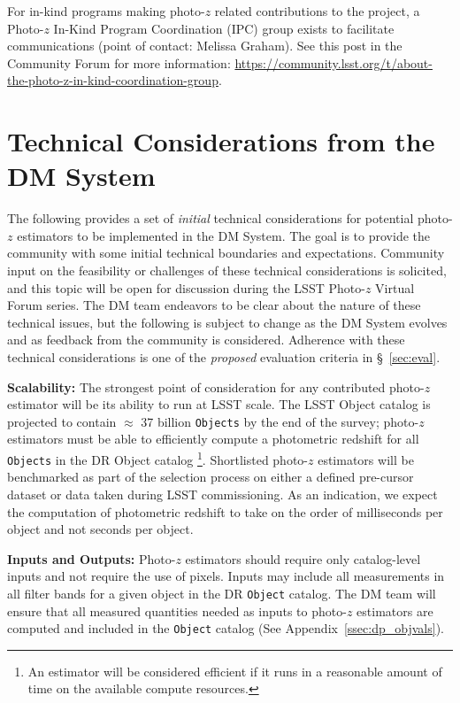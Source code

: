 \documentclass[DM,lsstdraft,toc]{lsstdoc}
\begin{document}
For in-kind programs making photo-$z$ related contributions to the project, a Photo-$z$ In-Kind Program Coordination (IPC) group exists to facilitate communications (point of contact: Melissa Graham). See this post in the Community Forum for more information: \url{https://community.lsst.org/t/about-the-photo-z-in-kind-coordination-group}.

\section{Technical Considerations from the DM System}\label{sec:dmcon}

The following provides a set of {\it initial} technical considerations for potential photo-$z$ estimators to be implemented in the DM System.
The goal is to provide the community with some initial technical boundaries and expectations. 
Community input on the feasibility or challenges of these technical considerations is solicited, and this topic will be open for discussion during the LSST Photo-$z$ Virtual Forum series.
The DM team endeavors to be clear about the nature of these technical issues, but the following is subject to change as the DM System evolves and as feedback from the community is considered. 
Adherence with these technical considerations is one of the {\it proposed} evaluation criteria in \S~\ref{sec:eval}.

\textbf{Scalability:}
The strongest point of consideration for any contributed  photo-$z$ estimator will be its ability to run at LSST scale. 
The LSST Object catalog is projected to contain $\approx$ 37 billion {\tt Objects} by the end of the survey;  photo-$z$ estimators must be able to efficiently compute a photometric redshift for all {\tt Objects} in the DR Object catalog \footnote{An estimator will be considered efficient if it runs in a reasonable amount of time on the available compute resources. }. 
Shortlisted photo-$z$ estimators will be benchmarked as part of the selection process on either a defined pre-cursor dataset or data taken during LSST commissioning. As an indication, we expect the computation of photometric redshift to take on the order of milliseconds per object and not seconds per object.

\textbf{Inputs and Outputs:}
Photo-$z$ estimators should require only catalog-level inputs and not require the use of pixels. 
Inputs may include all measurements in all filter bands for a given object in the DR {\tt Object} catalog. 
The DM team will ensure that all measured quantities needed as inputs to photo-$z$ estimators are computed and included in the {\tt Object} catalog (See Appendix~\ref{ssec:dp_objvals}). 
\end{document}
